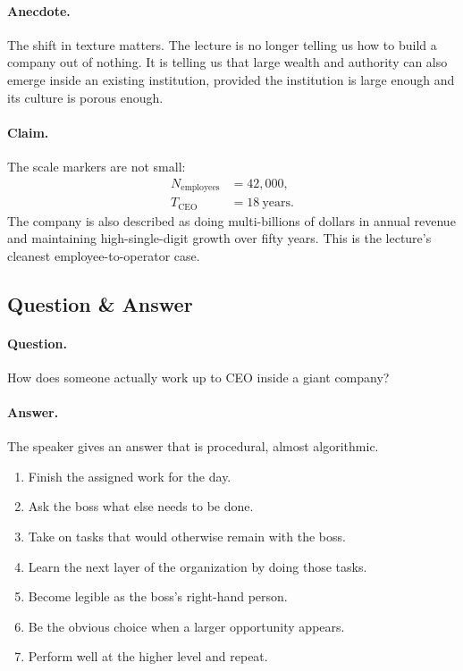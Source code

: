 \paragraph{Anecdote.} The shift in texture matters. The lecture is no longer telling us how to build a company out of nothing. It is telling us that large wealth and authority can also emerge inside an existing institution, provided the institution is large enough and its culture is porous enough.

\paragraph{Claim.} The scale markers are not small:
\begin{align}
N_{\mathrm{employees}} &= 42{,}000,\\
T_{\mathrm{CEO}} &= 18\ \mathrm{years}.
\end{align}
The company is also described as doing multi-billions of dollars in annual revenue and maintaining high-single-digit growth over fifty years. This is the lecture's cleanest employee-to-operator case.

\subsection{Question \& Answer}

\paragraph{Question.} How does someone actually work up to CEO inside a giant company?

\paragraph{Answer.} The speaker gives an answer that is procedural, almost algorithmic.

\begin{enumerate}
\item Finish the assigned work for the day.
\item Ask the boss what else needs to be done.
\item Take on tasks that would otherwise remain with the boss.
\item Learn the next layer of the organization by doing those tasks.
\item Become legible as the boss's right-hand person.
\item Be the obvious choice when a larger opportunity appears.
\item Perform well at the higher level and repeat.
\end{enumerate}

